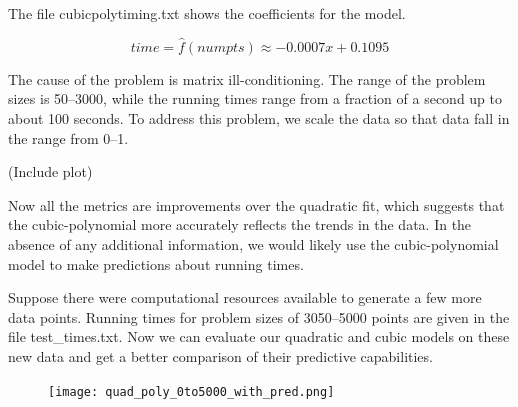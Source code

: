 \documentclass{article}
\begin{document}
The file cubicpolytiming.txt shows the coefficients for the model.




\[ time = \hat{f}(numpts) \approx - 0.0007x + 0.1095 \]

The cause of the problem is matrix ill-conditioning.  The range of the problem sizes is 50--3000, while the running times range from a fraction of a second up to about 100 seconds.  To address this problem, we scale the data so that data fall in the range from 0--1.



(Include plot)

Now all the metrics are improvements over the quadratic fit, which suggests that the cubic-polynomial more accurately reflects the trends in the data.  In the absence of any additional information, we would likely use the cubic-polynomial model to make predictions about running times. 

Suppose there were computational resources available to generate a few more data points.  Running times for problem sizes of 3050--5000 points are given in the file test\_times.txt.  Now we can evaluate our quadratic and cubic models on these new data and get a better comparison of their predictive capabilities.



\begin{centering}
\begin{figure}[htbp]
\texttt{[image: quad\_poly\_0to5000\_with\_pred.png]}
\end{figure}
\end{centering}
\end{document}
